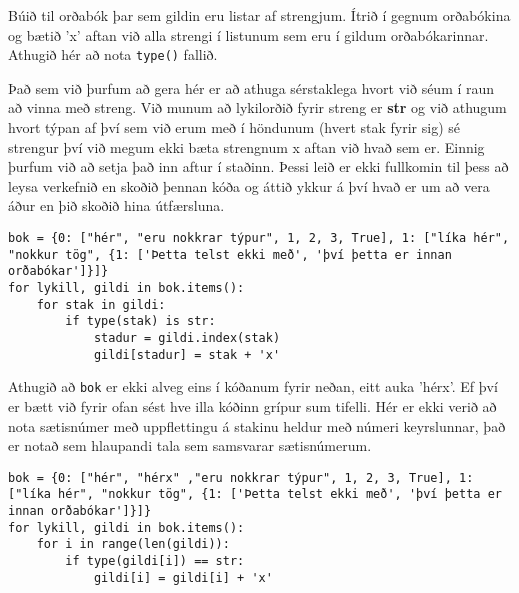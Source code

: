 \begin{exercise}\label{dic5}
Búið til orðabók þar sem gildin eru listar af strengjum.
Ítrið í gegnum orðabókina og bætið 'x' aftan við alla strengi í listunum sem eru í gildum  orðabókarinnar.
Athugið hér að nota \texttt{type()} fallið.
\end{exercise}
\begin{Answer}[ref={dic5}]
Það sem við þurfum að gera hér er að athuga sérstaklega hvort við séum í raun að vinna með streng.
Við munum að lykilorðið fyrir streng er \textbf{str} og við athugum hvort týpan af því sem við erum með í höndunum (hvert stak fyrir sig) sé strengur því við megum ekki bæta strengnum x aftan við hvað sem er.
Einnig þurfum við að setja það inn aftur í staðinn.
Þessi leið er ekki fullkomin til þess að leysa verkefnið en skoðið þennan kóða og áttið ykkur á því hvað er um að vera áður en þið skoðið hina útfærsluna.
	\begin{lstlisting}
bok = {0: ["hér", "eru nokkrar týpur", 1, 2, 3, True], 1: ["líka hér", "nokkur tög", {1: ['Þetta telst ekki með', 'því þetta er innan orðabókar']}]}
for lykill, gildi in bok.items():
	for stak in gildi:
		if type(stak) is str:
			stadur = gildi.index(stak)
			gildi[stadur] = stak + 'x'\end{lstlisting}
Athugið að \texttt{bok} er ekki alveg eins í kóðanum fyrir neðan, eitt auka 'hérx'.
Ef því er bætt við fyrir ofan sést hve illa kóðinn grípur sum tifelli.
Hér er ekki verið að nota sætisnúmer með uppflettingu á stakinu heldur með númeri keyrslunnar, það er notað sem hlaupandi tala sem samsvarar sætisnúmerum.
\begin{lstlisting}
bok = {0: ["hér", "hérx" ,"eru nokkrar týpur", 1, 2, 3, True], 1: ["líka hér", "nokkur tög", {1: ['Þetta telst ekki með', 'því þetta er innan orðabókar']}]}
for lykill, gildi in bok.items():
	for i in range(len(gildi)):
		if type(gildi[i]) == str:
			gildi[i] = gildi[i] + 'x'\end{lstlisting}
\end{Answer}

